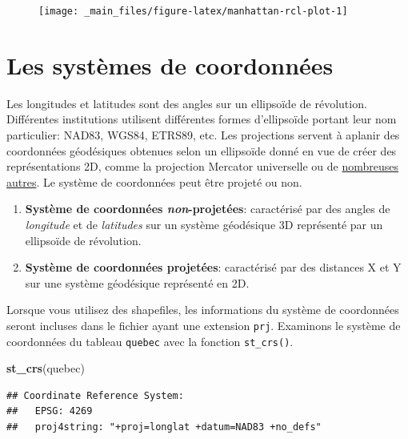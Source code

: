 \documentclass[]{book}
\newenvironment{Shaded}{\begin{snugshade}}{\end{snugshade}}
\newcommand{\KeywordTok}[1]{\textcolor[rgb]{0.13,0.29,0.53}{\textbf{#1}}}
\newcommand{\NormalTok}[1]{#1}
\providecommand{\tightlist}{%
  \setlength{\itemsep}{0pt}\setlength{\parskip}{0pt}}
\begin{document}
\begin{figure}

{\centering \texttt{[image: \_main\_files/figure-latex/manhattan-rcl-plot-1]} 

}

\caption{ }\label{fig:manhattan-rcl-plot}
\end{figure}

\hypertarget{section-systeme-coord}{%
\section{Les systèmes de coordonnées}\label{section-systeme-coord}}

Les longitudes et latitudes sont des angles sur un ellipsoïde de
révolution. Différentes institutions utilisent différentes formes
d'ellipsoïde portant leur nom particulier: NAD83, WGS84, ETRS89, etc.
Les projections servent à aplanir des coordonnées géodésiques obtenues
selon un ellipsoïde donné en vue de créer des représentations 2D, comme
la projection Mercator universelle ou de
\href{https://bl.ocks.org/mbostock/3711652}{nombreuses autres}. Le
système de coordonnées peut être projeté ou non.

\begin{enumerate}
\def\labelenumi{\arabic{enumi}.}
\tightlist
\item
  \textbf{Système de coordonnées \emph{non}-projetées}: caractérisé par
  des angles de \emph{longitude} et de \emph{latitudes} sur un système
  géodésique 3D représenté par un ellipsoïde de révolution.
\item
  \textbf{Système de coordonnées projetées}: caractérisé par des
  distances X et Y sur une système géodésique représenté en 2D.
\end{enumerate}

Lorsque vous utilisez des shapefiles, les informations du système de
coordonnées seront incluses dans le fichier ayant une extension
\texttt{prj}. Examinons le système de coordonnées du tableau
\texttt{quebec} avec la fonction \texttt{st\_crs()}.

\begin{Shaded}
\begin{Highlighting}[]
\KeywordTok{st_crs}\NormalTok{(quebec)}
\end{Highlighting}
\end{Shaded}

\begin{verbatim}
## Coordinate Reference System:
##   EPSG: 4269 
##   proj4string: "+proj=longlat +datum=NAD83 +no_defs"
\end{verbatim}
\end{document}
